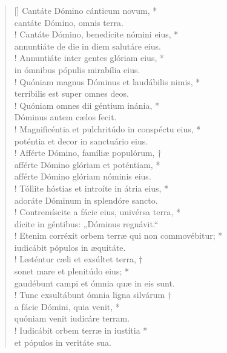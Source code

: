 \begin{verse}[\versewidth]
Cantáte Dómino cánticum novum, *\\
cantáte Dómino, omnis terra.\\!
\vin Cantáte Dómino, benedícite nómini eius, *\\
\vin annuntiáte de die in diem salutáre eius.\\!
Annuntiáte inter gentes glóriam eius, *\\
in ómnibus pópulis mirabília eius.\\!
\vin Quóniam magnus Dóminus et laudábilis nimis, *\\
\vin terríbilis est super omnes deos.\\!
Quóniam omnes dii géntium inánia, *\\
Dóminus autem cælos fecit.\\!
\vin Magnificéntia et pulchritúdo in conspéctu eius, *\\
\vin poténtia et decor in sanctuário eius.\\!
Afférte Dómino, famíliæ populórum, †\\
afférte Dómino glóriam et poténtiam, *\\
afférte Dómino glóriam nóminis eius.\\!
\vin Tóllite hóstias et introíte in átria eius, *\\
\vin adoráte Dóminum in splendóre sancto.\\!
Contremíscite a fácie eius, univérsa terra, *\\
dícite in géntibus: „Dóminus regnávit.“\\!
\vin Etenim corréxit orbem terræ qui non commovébitur; *\\
\vin iudicábit pópulos in æquitáte.\\!
Læténtur cæli et exsúltet terra, †\\
sonet mare et plenitúdo eius; *\\
gaudébunt campi et ómnia quæ in eis sunt.\\!
\vin Tunc exsultábunt ómnia ligna silvárum †\\
\vin a fácie Dómini, quia venit, *\\
\vin quóniam venit iudicáre terram.\\!
Iudicábit orbem terræ in iustítia *\\
et pópulos in veritáte sua.\\
\end{verse}
\vspace{1cm}


